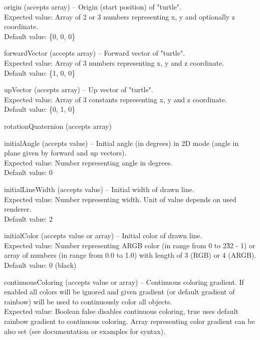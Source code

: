 	\begin{description*}
		\item[origin]
		(accepts array)
			-- Origin (start position) of "turtle".
			\\ Expected value: Array of 2 or 3 numbers representing x, y and optionally z coordinate.
			\\ Default value: \{0, 0, 0\}
		\item[forwardVector]
		(accepts array)
			-- Forward vector of "turtle".
			\\ Expected value: Array of 3 numbers representing x, y and z coordinate.
			\\ Default value: \{1, 0, 0\}
		\item[upVector]
		(accepts array)
			-- Up vector of "turtle".
			\\ Expected value: Array of 3 constants representing x, y and z coordinate.
			\\ Default value: \{0, 1, 0\}
		\item[rotationQuaternion]
		(accepts array)
		\item[initialAngle]
		(accepts value)
			-- Initial angle (in degrees) in 2D mode (angle in plane given by forward and up vectors).
			\\ Expected value: Number representing angle in degrees.
			\\ Default value: 0
		\item[initialLineWidth]
		(accepts value)
			-- Initial width of drawn line.
			\\ Expected value: Number representing width. Unit of value depends on used renderer.
			\\ Default value: 2
		\item[initialColor]
		(accepts value or array)
			-- Initial color of drawn line.
			\\ Expected value: Number representing ARGB color (in range from 0 to 2\^32 - 1) or array of numbers (in range from 0.0 to 1.0) with length of 3 (RGB) or 4 (ARGB).
			\\ Default value: 0 (black)
		\item[continuousColoring]
		(accepts value or array)
			-- Continuous coloring gradient.
            If enabled all colors will be ignored and given gradient (or default gradient of rainbow) will be used to continuously color all objects.
			\\ Expected value: Boolean false disables continuous coloring, true uses default rainbow gradient to continuous coloring.
            	Array representing color gradient can be also set (see documentation or examples for syntax).

\end{description*}
